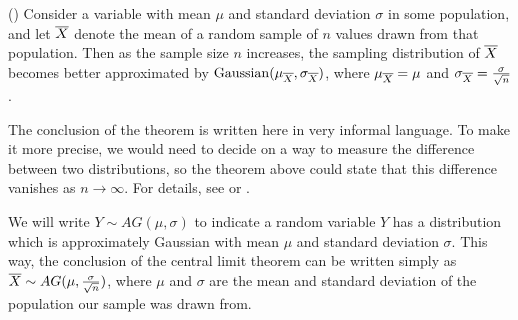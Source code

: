 \begin{theorem} ()\label{CLT} Consider a variable with mean $\mu$ and standard deviation $\sigma$ in some population, and let ${\overline{X}}$ denote the mean of a random sample of $n$ values drawn from that population. Then as the sample size $n$ increases, the sampling distribution of ${\overline{X}}$ becomes better approximated by $\operatorname{Gaussian}(\mu_{\overline{X}},\sigma_{\overline{X}})$, where $\mu_{{\overline{X}}} = \mu$ and $\sigma_{{\overline{X}}} = \frac{\sigma}{\sqrt{n}}$.
\end{theorem}

The conclusion of the theorem is written here in very informal language. To make it more precise, we would need to decide on a way to measure the difference between two distributions, so the theorem above could state that this difference vanishes as $n \to \infty$. For details, see \cite{DevoreBerk} or \cite{Ghahramani}.

We will write $Y \sim AG(\mu,\sigma)$ to indicate a random variable $Y$ has a distribution which is approximately Gaussian with mean $\mu$ and standard deviation $\sigma$. This way, the conclusion of the central limit theorem can be written simply as ${\overline{X}} \sim AG(\mu,\frac{\sigma}{\sqrt{n}})$, where $\mu$ and $\sigma$ are the mean and standard deviation of the population our sample was drawn from.

